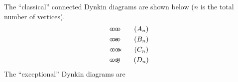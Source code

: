  The ``classical'' connected Dynkin diagrams are shown below ($n$ is the total number
 of vertices).
 \begin{gather*}
  \begin{xy}
    (0,0) *\cir<2pt>{};
    (1,0)  *\cir<2pt>{} **@{-};
    p+(.5,0) **@{-};
    p+(.6,0) **{\hspace{1pt}.\hspace{1pt}};
    p+(.5,0)  *\cir<2pt>{} **@{-};
    p+(1,0)  *\cir<2pt>{} **@{-};
  \end{xy} \tag{$A_n$}\\
  \begin{xy}
    (0,0) *\cir<2pt>{};
    (1,0)  *\cir<2pt>{} **@{-};
    p+(.5,0) **@{-};
    p+(.6,0) **{\hspace{1pt}.\hspace{1pt}};
    p+(.5,0)  *\cir<2pt>{} **@{-};
    p+(1,0)  *\cir<2pt>{} **@{=} ?*@{>};
  \end{xy} \tag{$B_n$}\\
  \begin{xy}
    (0,0) *\cir<2pt>{};
    (1,0)  *\cir<2pt>{} **@{-};
    p+(.5,0) **@{-};
    p+(.6,0) **{\hspace{1pt}.\hspace{1pt}};
    p+(.5,0)  *\cir<2pt>{} **@{-};
    p+(1,0)  *\cir<2pt>{} **@{=} ?*@{<};
  \end{xy} \tag{$C_n$}\\
  \begin{xy}
    (0,0) *\cir<2pt>{};
    (1,0)  *\cir<2pt>{} **@{-};
    p+(.5,0) **@{-};
    p+(.6,0) **{\hspace{1pt}.\hspace{1pt}};
    p+(.5,0)  *\cir<2pt>{} **@{-};
    p+a(25)  *\cir<2pt>{} **@{-},
    p+a(-25)  *\cir<2pt>{} **@{-};
  \end{xy} \tag{$D_n$}\\
 \end{gather*}
 The ``exceptional'' Dynkin diagrams are
